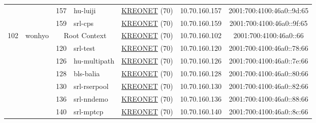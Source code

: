 \begin{small}
\begin{center}
\begin{longtable}{|c|c|c|c|c|c|c|c|}
  &  & \tiny{157} & \multicolumn{1}{|l|}{\tiny{hu-luiji}} & \multicolumn{2}{|c|}{\tiny{\href{http://www.kreonet.net}{KREONET} (70)}} & \tiny{10.70.160.157} & \tiny{2001:700:4100:46a0::9d:65} \\* \cline{3-3}\cline{4-4}\cline{5-5}\cline{6-6}\cline{7-7}\cline{8-8}
  &  & \tiny{159} & \multicolumn{1}{|l|}{\tiny{srl-cps}} & \multicolumn{2}{|c|}{\tiny{\href{http://www.kreonet.net}{KREONET} (70)}} & \tiny{10.70.160.159} & \tiny{2001:700:4100:46a0::9f:65} \\ \hline
 \multirow{12}{*}{\tiny{102}} & \multicolumn{1}{|l|}{\multirow{12}{*}{\tiny{wonhyo}}} & \multicolumn{2}{|c|}{\tiny{Root Context}} & \multicolumn{2}{|c|}{\tiny{\href{http://www.kreonet.net}{KREONET} (70)}} & \tiny{10.70.160.102} & \tiny{2001:700:4100:46a0::66} \\* \cline{3-3}\cline{4-4}\cline{5-5}\cline{6-6}\cline{7-7}\cline{8-8}
  &  & \tiny{120} & \multicolumn{1}{|l|}{\tiny{srl-test}} & \multicolumn{2}{|c|}{\tiny{\href{http://www.kreonet.net}{KREONET} (70)}} & \tiny{10.70.160.120} & \tiny{2001:700:4100:46a0::78:66} \\* \cline{3-3}\cline{4-4}\cline{5-5}\cline{6-6}\cline{7-7}\cline{8-8}
  &  & \tiny{126} & \multicolumn{1}{|l|}{\tiny{hu-multipath}} & \multicolumn{2}{|c|}{\tiny{\href{http://www.kreonet.net}{KREONET} (70)}} & \tiny{10.70.160.126} & \tiny{2001:700:4100:46a0::7e:66} \\* \cline{3-3}\cline{4-4}\cline{5-5}\cline{6-6}\cline{7-7}\cline{8-8}
  &  & \tiny{128} & \multicolumn{1}{|l|}{\tiny{bls-balia}} & \multicolumn{2}{|c|}{\tiny{\href{http://www.kreonet.net}{KREONET} (70)}} & \tiny{10.70.160.128} & \tiny{2001:700:4100:46a0::80:66} \\* \cline{3-3}\cline{4-4}\cline{5-5}\cline{6-6}\cline{7-7}\cline{8-8}
  &  & \tiny{130} & \multicolumn{1}{|l|}{\tiny{srl-rserpool}} & \multicolumn{2}{|c|}{\tiny{\href{http://www.kreonet.net}{KREONET} (70)}} & \tiny{10.70.160.130} & \tiny{2001:700:4100:46a0::82:66} \\* \cline{3-3}\cline{4-4}\cline{5-5}\cline{6-6}\cline{7-7}\cline{8-8}
  &  & \tiny{136} & \multicolumn{1}{|l|}{\tiny{srl-nndemo}} & \multicolumn{2}{|c|}{\tiny{\href{http://www.kreonet.net}{KREONET} (70)}} & \tiny{10.70.160.136} & \tiny{2001:700:4100:46a0::88:66} \\* \cline{3-3}\cline{4-4}\cline{5-5}\cline{6-6}\cline{7-7}\cline{8-8}
  &  & \tiny{140} & \multicolumn{1}{|l|}{\tiny{srl-mptcp}} & \multicolumn{2}{|c|}{\tiny{\href{http://www.kreonet.net}{KREONET} (70)}} & \tiny{10.70.160.140} & \tiny{2001:700:4100:46a0::8c:66} \\* \cline{3-3}\cline{4-4}\cline{5-5}\cline{6-6}\cline{7-7}\cline{8-8}

\end{longtable}
\end{center}
\end{small}
